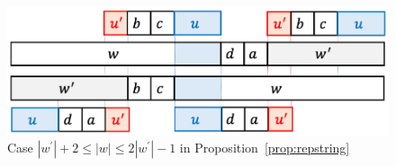 \begin{figure}[t]
\begin{center}
  \includegraphics[scale=0.345]{figs/w=w_1+2.pdf}
  \caption{Case $|w^{\prime}| + 2 \le |w| \le 2|w^{\prime}| - 1$ in Proposition~\ref{prop:repstring}}\label{fig:prop_pic9}
\end{center}
\end{figure}

